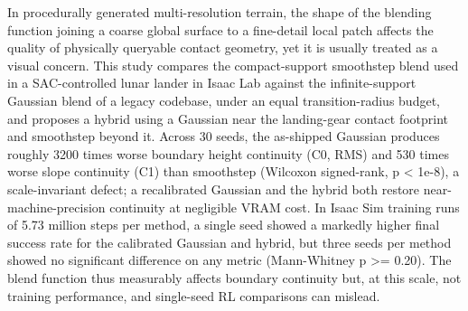In procedurally generated multi-resolution terrain, the shape of the blending function joining a coarse global surface to a fine-detail local patch affects the quality of physically queryable contact geometry, yet it is usually treated as a visual concern. This study compares the compact-support smoothstep blend used in a SAC-controlled lunar lander in Isaac Lab against the infinite-support Gaussian blend of a legacy codebase, under an equal transition-radius budget, and proposes a hybrid using a Gaussian near the landing-gear contact footprint and smoothstep beyond it. Across 30 seeds, the as-shipped Gaussian produces roughly 3200 times worse boundary height continuity (C0, RMS) and 530 times worse slope continuity (C1) than smoothstep (Wilcoxon signed-rank, p < 1e-8), a scale-invariant defect; a recalibrated Gaussian and the hybrid both restore near-machine-precision continuity at negligible VRAM cost. In Isaac Sim training runs of 5.73 million steps per method, a single seed showed a markedly higher final success rate for the calibrated Gaussian and hybrid, but three seeds per method showed no significant difference on any metric (Mann-Whitney p >= 0.20). The blend function thus measurably affects boundary continuity but, at this scale, not training performance, and single-seed RL comparisons can mislead.
